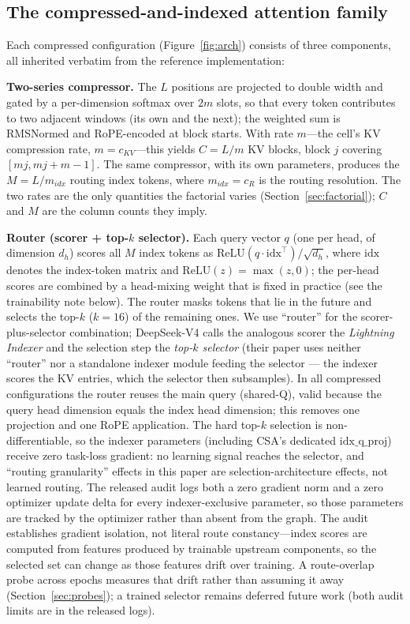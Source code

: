 \subsection{The compressed-and-indexed attention family}
\label{sec:family-mech}
Each compressed configuration (Figure~\ref{fig:arch}) consists of three
components, all inherited verbatim from the reference implementation:

\textbf{Two-series compressor.} The $L$ positions are projected to double
width and gated by a per-dimension softmax over $2m$ slots, so that every
token contributes to two adjacent windows (its own and the next); the
weighted sum is RMSNormed and RoPE-encoded at block starts. With rate
$m$---the cell's KV compression rate, $m = c_{KV}$---this yields
$C = L/m$ KV blocks, block $j$ covering $[mj, mj + m - 1]$. The
same compressor, with its own parameters, produces the $M = L / m_{idx}$
routing index tokens, where $m_{idx} = c_R$ is the routing resolution. The
two rates are the only quantities the factorial varies
(Section~\ref{sec:factorial}); $C$ and $M$ are the column counts they imply.

\textbf{Router (scorer + top-$k$ selector).} Each query vector $q$ (one per
head, of dimension $d_h$) scores all $M$ index tokens as
$\mathrm{ReLU}(q \cdot \mathrm{idx}^\top)/\sqrt{d_h}$, where
$\mathrm{idx}$ denotes the index-token matrix and
$\mathrm{ReLU}(z) = \max(z, 0)$; the per-head scores are combined by a
head-mixing weight that is fixed in practice (see the trainability note
below). The router masks tokens that lie in the future and selects the
top-$k$ ($k{=}16$) of the remaining ones. We use ``router'' for the scorer-plus-selector
combination; DeepSeek-V4 \citep{deepseekv4_2026} calls the analogous scorer
the \emph{Lightning Indexer} and the selection step the \emph{top-$k$
selector} (their paper uses neither ``router'' nor a standalone indexer
module feeding the selector --- the indexer scores the KV entries, which the
selector then subsamples). In all compressed configurations the router reuses the
main query (shared-Q), valid because the query head dimension equals the
index head dimension; this removes one projection and one RoPE application.
The hard top-$k$ selection is non-differentiable, so the indexer parameters
(including CSA's dedicated $\mathrm{idx\_q\_proj}$) receive zero task-loss
gradient: no learning signal reaches the selector, and ``routing granularity'' effects in
this paper are selection-architecture effects, not learned routing. The released audit
logs both a zero gradient norm and a zero optimizer update delta for every
indexer-exclusive parameter, so those parameters are tracked by the optimizer rather
than absent from the graph. The audit
establishes gradient isolation, not literal route constancy---index scores are
computed from features produced by trainable upstream components, so the selected
set can change as those features drift over training. A route-overlap probe across
epochs measures that drift rather than assuming it away (Section~\ref{sec:probes});
a trained selector remains deferred future work (both audit limits are in the
released logs).

